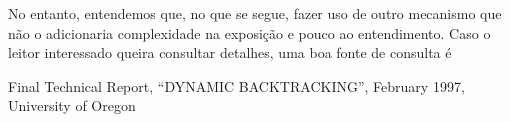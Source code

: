 \documentclass{article}
\begin{document}
No entanto, entendemos que, no que se segue, fazer uso de outro mecanismo que não o
 adicionaria complexidade na exposição e pouco  ao
entendimento. Caso o leitor interessado queira consultar detalhes, uma boa fonte de consulta é
\cite{dyn}




  \begin{thebibliography}{2}

    Final Technical Report,
    ``DYNAMIC BACKTRACKING'',
    February 1997,
    University of Oregon


  \end{thebibliography}
\end{document}
